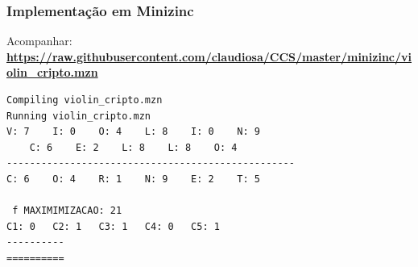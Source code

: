 \documentclass{beamer}
\begin{document}
\begin{frame}[fragile] 

\frametitle{Implementação em Minizinc}

Acompanhar: \\
{\bf \textcolor{magenta}{ \url{https://raw.githubusercontent.com/claudiosa/CCS/master/minizinc/violin_cripto.mzn}}}
{\small
\begin{verbatim}
Compiling violin_cripto.mzn
Running violin_cripto.mzn
V: 7	I: 0	O: 4	L: 8	I: 0	N: 9
    C: 6	E: 2	L: 8	L: 8	O: 4
--------------------------------------------------
C: 6	O: 4	R: 1	N: 9	E: 2	T: 5

 f MAXIMIMIZACAO: 21
C1: 0	C2: 1	C3: 1	C4: 0	C5: 1
----------
==========
\end{verbatim}
}
\end{frame}
\end{document}
